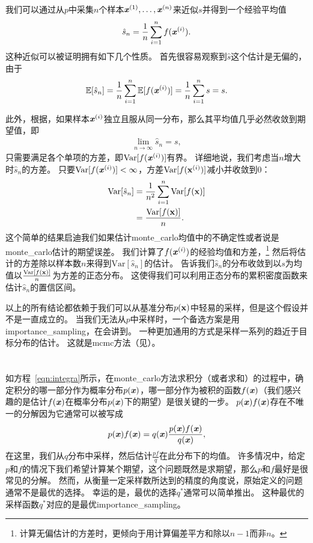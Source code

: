 我们可以通过从$p$中采集$n$个样本$\boldsymbol{\mathit{x}}^{(1)},\ldots,\boldsymbol{\mathit{x}}^{(n)}$来近似$s$并得到一个经验平均值
\begin{align}
\hat{s}_n = \frac{1}{n}\sum_{i=1}^{n}f(\boldsymbol{\mathit{x}}^{(i)}).
\end{align}
这种近似可以被证明拥有如下几个性质。
首先很容易观察到$\hat{s}$这个估计是无偏的，由于
\begin{align}
\mathbb{E}[\hat{s}_n] = \frac{1}{n}\sum_{i=1}^{n}\mathbb{E}[f(\boldsymbol{\mathit{x}}^{(i)})] = \frac{1}{n}\sum_{i=1}^{n}s = s.
\end{align}

此外，根据，如果样本$\boldsymbol{\mathit{x}}^{(i)}$独立且服从同一分布，那么其平均值几乎必然收敛到期望值，即
\begin{align}
\lim_{n\xrightarrow{}\infty} \hat{s}_n = s,
\end{align}
只需要满足各个单项的方差，即$\text{Var}[f(\boldsymbol{\mathit{x}}^{(i)})]$有界。
详细地说，我们考虑当$n$增大时$\hat{s}_n$的方差。
只要$\text{Var}[f(\boldsymbol{\mathit{x}}^{(i)})]<\infty$，方差$\text{Var}[f(\mathbf{x}^{(i)})]$减小并收敛到$0$：
\begin{align}
\text{Var}[\hat{s}_n] & = \frac{1}{n^2}\sum_{i=1}^{n}\text{Var}[f(\mathbf{x})]\\
&  = \frac{\text{Var}[f(\mathbf{x})]}{n}.
\end{align}
这个简单的结果启迪我们如果估计\gls{monte_carlo}均值中的不确定性或者说是\gls{monte_carlo}估计的期望误差。
我们计算了$f(\boldsymbol{\mathit{x}}^{(i)})$的经验均值和方差，\footnote{计算无偏估计的方差时，更倾向于用计算偏差平方和除以$n-1$而非$n$。}
然后将估计的方差除以样本数$n$来得到$\text{Var}[\hat{s}_n]$的估计。
告诉我们$\hat{s}_n$的分布收敛到以$s$为均值以$\frac{\text{Var}[f(\mathbf{x})]}{n}$为方差的正态分布。
这使得我们可以利用正态分布的累积密度函数来估计$\hat{s}_n$的置信区间。

以上的所有结论都依赖于我们可以从基准分布$p(\mathbf{x})$中轻易的采样，但是这个假设并不是一直成立的。
当我们无法从$p$中采样时，一个备选方案是用\gls{importance_sampling}，在会讲到。
一种更加通用的方式是采样一系列的趋近于目标分布的估计。
这就是\gls{mcmc}方法（见）。

\section{}
\label{sec:importance_sampling_chap17}

如方程~\eqref{eqn:integra}所示，在\gls{monte_carlo}方法求积分（或者求和）的过程中，确定积分的哪一部分作为概率分布$p(\boldsymbol{\mathit{x}})$，哪一部分作为被积的函数$f(\boldsymbol{\mathit{x}})$（我们感兴趣的是估计$f(\boldsymbol{\mathit{x}})$在概率分布$p(\boldsymbol{\mathit{x}})$下的期望）是很关键的一步。
$p(\boldsymbol{\mathit{x}})f(\boldsymbol{\mathit{x}})$存在不唯一的分解因为它通常可以被写成
\begin{align}
\label{eqn:decomposition}
p(\boldsymbol{\mathit{x}})f(\boldsymbol{\mathit{x}}) = q(\boldsymbol{\mathit{x}}) \frac{p(\boldsymbol{\mathit{x}})f(\boldsymbol{\mathit{x}})}{q(\boldsymbol{\mathit{x}})},
\end{align}
在这里，我们从$q$分布中采样，然后估计$\frac{pf}{q}$在此分布下的均值。
许多情况中，给定$p$和$f$的情况下我们希望计算某个期望，这个问题既然是求期望，那么$p$和$f$最好是很常见的分解。
然而，从衡量一定采样数所达到的精度的角度说，原始定义的问题通常不是最优的选择。
幸运的是，最优的选择$q^*$通常可以简单推出。
这种最优的采样函数$q^*$对应的是最优\gls{importance_sampling}。


